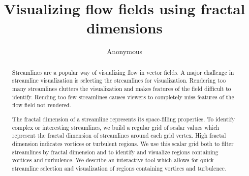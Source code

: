 \documentclass{egpubl}
\title{Visualizing flow fields using fractal dimensions}
\author{Anonymous}
\begin{document}
\maketitle

\begin{abstract}
Streamlines are a popular way of visualizing flow in vector fields.
A major challenge in streamline visualization is selecting the streamlines
for visualization.
Rendering too many streamlines clutters the visualization and makes
features of the field difficult to identify. 
Rending too few streamlines causes viewers to completely miss features
of the flow field not rendered. 

The fractal dimension of a streamline represents its space-filling properties.
To identify complex or interesting streamlines, 
we build a regular grid of scalar values 
which represent the fractal dimension of streamlines around each grid vertex.
High fractal dimension indicates vortices or turbulent regions.
We use this scalar grid both to filter streamlines by fractal dimension
and to identify and visualize regions containing vortices and turbulence.
We describe an interactive tool which allows for quick streamline selection
and visualization of regions containing vortices and turbulence.
\end{abstract}







\renewcommand{\textfraction}{0.2}
\renewcommand{\dbltopfraction}{0.8}	
\renewcommand{\topfraction}{0.8}	


\end{document}

